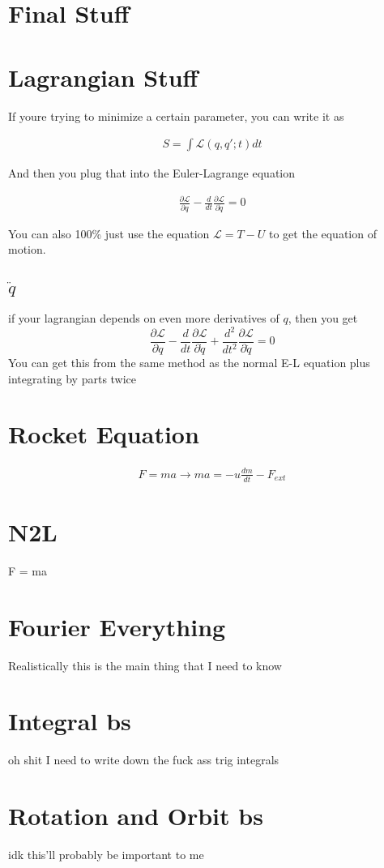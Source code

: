 \documentclass[fleqn]{article}
\date{Fall 2024}
\newcommand{\del}{\partial}
\newcommand{\equations} [1] {
\begin{gather*}
#1
\end{gather*}
}
\begin{document}
\pagestyle{empty}

\section{Final Stuff}

\section{Lagrangian Stuff}
If youre trying to minimize a certain parameter, you can write it as 
\equations{
    S = \int \mathcal L(q, q'; t) dt 
}
And then you plug that into the Euler-Lagrange equation 
\equations{
    \frac{\del \mathcal L}{\del q} - 
    \frac{d}{dt} \frac{\del \mathcal L}{\del \dot q} = 0
}

You can also 100\% just use the equation $\mathcal L = T - U$ to get the 
equation of motion.

\subsection{$\ddot q$}
if your lagrangian depends on even more derivatives of $q$, then you get 
\[
\frac{\del \mathcal L}{\del q}
-
\frac{d}{dt}
\frac{\del \mathcal L}{\del \dot q}
+
\frac{d^2}{dt^2}
\frac{\del \mathcal L}{\del \ddot q}
=
0
\]
You can get this from the same method as the normal E-L equation 
plus integrating by parts twice 

\section{Rocket Equation}
\equations{
    F = ma 
    \rightarrow 
    ma = - u \frac{dm}{dt} - F_{ext}
}

\section{N2L}
F = ma 

\section{Fourier Everything}
Realistically this is the main thing that I need to know 

\section{Integral bs}
oh shit I need to write down the fuck ass trig integrals 

\section{Rotation and Orbit bs}
idk this'll probably be important to me 
\end{document}
